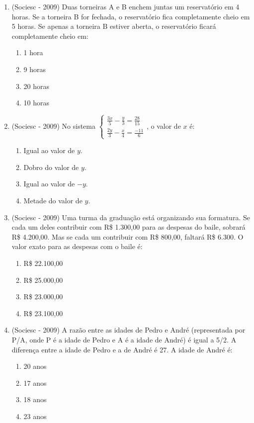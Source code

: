 \begin{enumerate}
\item (Sociesc - 2009) Duas torneiras A e B enchem juntas um reservatório em 4 horas. Se a torneira B for fechada, o reservatório fica completamente cheio em 5 horas. Se apenas a torneira B estiver aberta, o reservatório ficará completamente cheio em:
  \begin{enumerate}
  \item 1 hora
  \item 9 horas
  \item 20 horas
  \item 10 horas
 \end{enumerate}
 
 \item (Sociesc - 2009) No sistema
 $\begin{cases}
  \frac{3x}{5} - \frac{y}{3} = \frac{28}{15} \\
  \frac{2y}{3} - \frac{x}{4} = \frac{-11}{6}
 \end{cases}$, o valor de $x$ é:
  \begin{enumerate}
  \item Igual ao valor de $y$.
  \item Dobro do valor de $y$.
  \item Igual ao valor de $-y$.
  \item Metade do valor de $y$.
 \end{enumerate}
 
 \item (Sociesc - 2009) Uma turma da graduação está organizando sua formatura. Se cada um deles contribuir com R\$ 1.300,00 para as despesas do baile, sobrará R\$ 4.200,00. Mas se cada um contribuir com R\$ 800,00, faltará R\$ 6.300. O valor exato para as despesas com o baile é:
  \begin{enumerate}
  \item R\$ 22.100,00
  \item R\$ 25.000,00
  \item R\$ 23.000,00
  \item R\$ 23.100,00
 \end{enumerate}
 
 \item (Sociesc - 2009) A razão entre as idades de Pedro e André (representada por P/A, onde P é a idade de Pedro e A é a idade de André) é igual a 5/2. A diferença entre a idade de Pedro e a de André é 27. A idade de André é:
 \begin{enumerate}
  \item 20 anos
  \item 17 anos
  \item 18 anos
  \item 23 anos
 \end{enumerate}
 

\end{enumerate}
